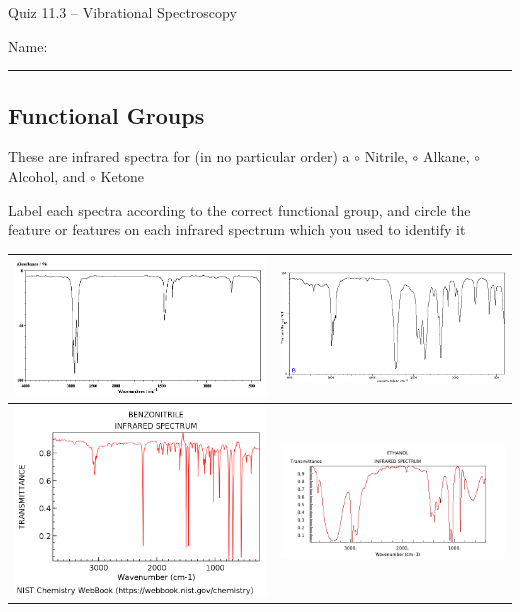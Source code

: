 \documentclass[11pt, letterpaper]{memoir}
\begin{document}
	\begin{center}
		{\large Quiz 11.3 -- Vibrational Spectroscopy}
	\end{center}
	{\large Name: \rule[-1mm]{4in}{.1pt} 

\subsection*{Functional Groups}
These are infrared spectra for (in no particular order) a $\circ$ Nitrile, $\circ$ Alkane, $\circ$ Alcohol, and $\circ$ Ketone

\noindent
Label each spectra according to the correct functional group, and circle the feature or features on each infrared spectrum which you used to identify it

\noindent
\begin{tabular}{c|c}
	\includegraphics[width=0.49\linewidth]{Alkane} & \includegraphics[width=0.49\linewidth]{Ketone} \\ \midrule
	\includegraphics[width=0.49\linewidth, trim = 0 0 0 40, clip]{Nitrile} & \includegraphics[width=0.49\linewidth, trim = 25 0 40 32, clip]{Alcohol}
\end{tabular}


}
\end{document}
